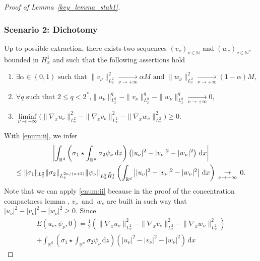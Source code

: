 \documentclass[JEP,XML,SOM,NoEqCountersInSection,NoFloatCountersInSection,Unicode,published]{cedram}
\newenvironment{enumeratei}
{\bgroup\def\theenumi{\roman{enumi}}\def\theenumii{\arabic{enumii}}\begin{enumerate}}
{\end{enumerate}\egroup}
\theoremstyle{definition}
\newcommand*{\overbigdot}[1]{%
\accentset{\mbox{\large\bfseries .}}{#1}}
\newenvironment{ProofOf}[1]{\begin{proof}[Proof of #1]}{\end{proof}}
\newcommand{\R}{\mathbb{R}}
\let\ds\displaystyle
\newcommand{\ud}{\, {\mathrm{d}}}
\begin{document}
\begin{ProofOf}{Lemma~\ref{key_lemma_stab1}}
\subsubsection*{Scenario 2: Dichotomy} Up to possible extraction, there exists two sequences $(v_{\nu})_{\nu\in\mathbb N}$ and $(w_{\nu})_{\nu\in\mathbb N}$, bounded in $H_{x}^{1}$
and such that the following assertions hold
\begin{enumeratei}
\item\label{enum:i}
$\ds \exists\alpha\in(0,1)\text{ such that }\|v_{\nu}\|_{L_{x}^{2}}^{2}\underset{\nu\to+\infty}{\to}\alpha M\text{ and }\|w_{\nu}\|_{L_{x}^{2}}^{2}\underset{\nu\to+\infty}{\to}(1-\alpha)M$,
\item
\label{enum:ii}
$\forall q$ such that $2\leq q<2^{*}$,\quad$\ds\|u_{\nu}\|_{L_{x}^{q}}^{q}-\|v_{\nu}\|_{L_{x}^{q}}^{q}-\|w_{\nu}\|_{L_{x}^{q}}^{q}\underset{\nu\to+\infty}{\to}0$,
\item
\label{enum:iii}
$\ds\underset{\nu\to+\infty}{\liminf}\bigl(\|\nabla_{x}u_{\nu}\|_{L_{x}^{2}}^{2}-\|\nabla_{x}v_{\nu}\|_{L_{x}^{2}}^{2}-\|\nabla_{x}w_{\nu}\|_{L_{x}^{2}}^{2}\bigr)\geq0$.
\end{enumeratei}
\noindent
With \eqref{enum:ii}, we infer
\begin{multline}\label{application_ii}
\left|\int_{\R^{d}}\left(\sigma_{1}\star\int_{\R^{n}}\sigma_{2}\psi_{\nu}\ud z\right)\left(|u_{\nu}|^{2}-|v_{\nu}|^{2}-|w_{\nu}|^{2}\right)\ud x\right|\\
\leq\|\sigma_{1}\|_{L_{x}^{2}}\|\sigma_{2}\|_{L_{z}^{2n/(n+2)}}\|\psi_{\nu}\|_{L_{x}^{2}\overbigdot{H}_{z}^{1}}\left(\int_{\R^{d}}\left||u_{\nu}|^{2}-|v_{\nu}|^{2}-|w_{\nu}|^{2}\right|\ud x\right)\,\underset{\nu\to +\infty}{\to}\,0.
\end{multline}
Note that we can apply \eqref{enum:ii} because in the proof of the concentration compactness lemma
\cite[Prop.\,1.7.6, sp. (1.7.11) \& (1.7.12)]{Caze}
\cite[Proof of Lem.\,I.1 \& Lem.\,III.1]{PLLcc1},
$v_{\nu}$~and~$w_{\nu}$ are built in such way that $|u_{\nu}|^{2}-|v_{\nu}|^{2}-|w_{\nu}|^{2}\geq 0$. Since\vspace*{-10pt}
\bgroup
{}
\begin{multline*}
E(u_{\nu},\psi_{\nu},0)=\frac{1}{2}\left(\|\nabla_{x}u_{\nu}\|_{L_{x}^{2}}^{2}-\|\nabla_{x}v_{\nu}\|_{L_{x}^{2}}^{2}-\|\nabla_{x}w_{\nu}\|_{L_{x}^{2}}^{2}\right)\\
+\int_{\R^{d}}\left(\sigma_{1}\star\int_{\R^{n}}\sigma_{2}\psi_{\nu}\ud z\right)\left(|u_{\nu}|^{2}-|v_{\nu}|^{2}-|w_{\nu}|^{2}\right)\ud x

\end{multline*}
\end{ProofOf}
\end{document}
